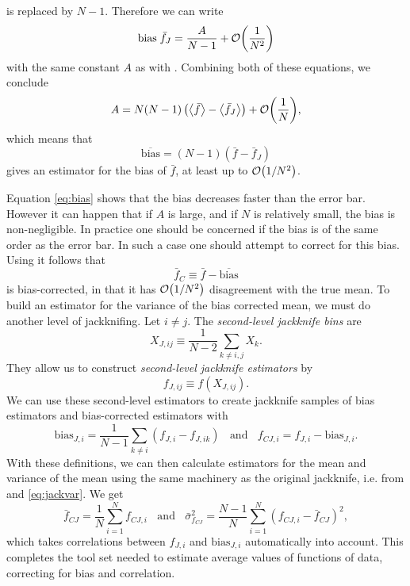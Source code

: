 is replaced by $N-1$. Therefore we can write
\begin{equation}
  \text{bias}\;\bar{f}_J=\frac{A}{N-1}+\order{\frac{1}{N^2}}
\end{equation}
with the same constant $A$ as with . Combining both
of these equations, we conclude
\begin{equation}
  A=N(N-1)\left(\ev{\bar{f}}-\ev{\bar{f}_J}\right)
     +\order{\frac{1}{N}},
\end{equation}
which means that
\begin{equation}\label{eq:biasest}
  \overline{\text{bias}}=(N-1)(\bar{f}-\bar{f}_J)
\end{equation}
gives an estimator for the bias of $\bar{f}$, at least up to 
$\order{1/N^2}$.

Equation \eqref{eq:bias} shows that the bias decreases faster than the
error bar. However it can happen that if $A$ is large, and if $N$ is
relatively small, the bias is non-negligible. In practice one should
be concerned if the bias is of the same order as the error bar. In such
a case one should attempt to correct for this bias. Using 
 it follows that
\begin{equation}
  \bar{f}_C\equiv \bar{f}-\overline{\text{bias}}
\end{equation}
is bias-corrected, in that it has $\order{1/N^2}$ disagreement
with the true mean. To build an estimator for the variance of the
bias corrected mean, we must do another level of jackknifing.
Let $i\neq j$. The {\it second-level jackknife bins} 
 are
\begin{equation}
  X_{J,ij}\equiv\frac{1}{N-2}\sum_{k\neq i,j}X_k.
\end{equation}
They allow us to construct {\it second-level jackknife estimators} by
\begin{equation}
  f_{J,ij}\equiv f(X_{J,ij}).
\end{equation}
We can use these second-level estimators to create jackknife samples of
bias estimators and bias-corrected estimators with
\begin{equation}
  \text{bias}_{J,i}=
   \frac{1}{N-1}\sum_{k\neq i}(f_{J,i}-f_{J,ik})~~~~\text{and}~~~~
    f_{CJ,i}=f_{J,i}-\text{bias}_{J,i}.
\end{equation}
With these definitions, we can then calculate estimators for the mean
and variance of the mean using the same machinery as the original
jackknife, i.e. from  and \eqref{eq:jackvar}.
We get
\begin{equation}
  \bar{f}_{CJ}=\frac{1}{N}\sum_{i=1}^N f_{CJ,i}~~~~\text{and}~~~~
   \bar\sigma_{f_{CJ}}^2
    =\frac{N-1}{N}\sum_{i=1}^N(f_{CJ,i}-\bar{f}_{CJ})^2,
\end{equation}
which takes correlations between $f_{J,i}$ and $\text{bias}_{J,i}$
automatically into account. This completes the tool set needed to
estimate average values of functions of data, correcting for bias and
correlation.

